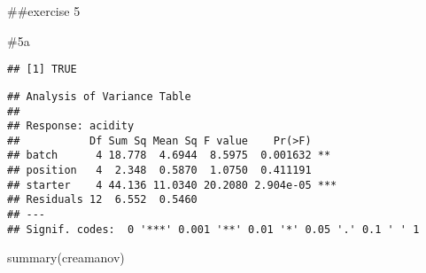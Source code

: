 \documentclass[
]{article}
\newenvironment{Shaded}{\begin{snugshade}}{\end{snugshade}}
\newcommand{\AttributeTok}[1]{\textcolor[rgb]{0.77,0.63,0.00}{#1}}
\newcommand{\FunctionTok}[1]{\textcolor[rgb]{0.00,0.00,0.00}{#1}}
\newcommand{\NormalTok}[1]{#1}
\newcommand{\OtherTok}[1]{\textcolor[rgb]{0.56,0.35,0.01}{#1}}
\newcommand{\SpecialCharTok}[1]{\textcolor[rgb]{0.00,0.00,0.00}{#1}}
\newcommand{\StringTok}[1]{\textcolor[rgb]{0.31,0.60,0.02}{#1}}
\begin{document}
\#\#exercise 5

\#5a

\begin{Shaded}
\end{Shaded}

\begin{verbatim}
## [1] TRUE
\end{verbatim}

\begin{Shaded}
\end{Shaded}

\begin{verbatim}
## Analysis of Variance Table
## 
## Response: acidity
##           Df Sum Sq Mean Sq F value    Pr(>F)    
## batch      4 18.778  4.6944  8.5975  0.001632 ** 
## position   4  2.348  0.5870  1.0750  0.411191    
## starter    4 44.136 11.0340 20.2080 2.904e-05 ***
## Residuals 12  6.552  0.5460                      
## ---
## Signif. codes:  0 '***' 0.001 '**' 0.01 '*' 0.05 '.' 0.1 ' ' 1
\end{verbatim}

\begin{Shaded}
\begin{Highlighting}[]
\FunctionTok{summary}\NormalTok{(creamanov)}
\end{Highlighting}
\end{Shaded}
\end{document}
